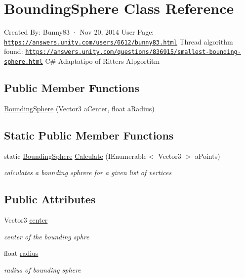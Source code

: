\hypertarget{class_bounding_sphere}{}\section{Bounding\+Sphere Class Reference}
\label{class_bounding_sphere}


Created By\+: Bunny83 · Nov 20, 2014 User Page\+: \href{https://answers.unity.com/users/6612/bunny83.html}{\tt https\+://answers.\+unity.\+com/users/6612/bunny83.\+html} Thread algorithm found\+: \href{https://answers.unity.com/questions/836915/smallest-bounding-sphere.html}{\tt https\+://answers.\+unity.\+com/questions/836915/smallest-\/bounding-\/sphere.\+html} C\# Adaptatipo of Ritters Alpgortitm  


\subsection*{Public Member Functions}
\begin{DoxyCompactItemize}
\item 
\mbox{\hyperlink{class_bounding_sphere_ad35e7960a2e532e8f7cbebbca2136ef7}{Bounding\+Sphere}} (Vector3 a\+Center, float a\+Radius)
\end{DoxyCompactItemize}
\subsection*{Static Public Member Functions}
\begin{DoxyCompactItemize}
\item 
static \mbox{\hyperlink{class_bounding_sphere}{Bounding\+Sphere}} \mbox{\hyperlink{class_bounding_sphere_a29c277d13a701089666b94fabf3c87d6}{Calculate}} (I\+Enumerable$<$ Vector3 $>$ a\+Points)
\begin{DoxyCompactList}\small\item\em calculates a bounding sphrere for a given list of vertices \end{DoxyCompactList}\end{DoxyCompactItemize}
\subsection*{Public Attributes}
\begin{DoxyCompactItemize}
\item 
Vector3 \mbox{\hyperlink{class_bounding_sphere_a0996d0f450c5e7fcca8446ebbd8ddc20}{center}}
\begin{DoxyCompactList}\small\item\em center of the bounding sphre \end{DoxyCompactList}\item 
float \mbox{\hyperlink{class_bounding_sphere_ad507cd54bc4021617024c2545fe9379c}{radius}}
\begin{DoxyCompactList}\small\item\em radius of bounding sphere \end{DoxyCompactList}\end{DoxyCompactItemize}


